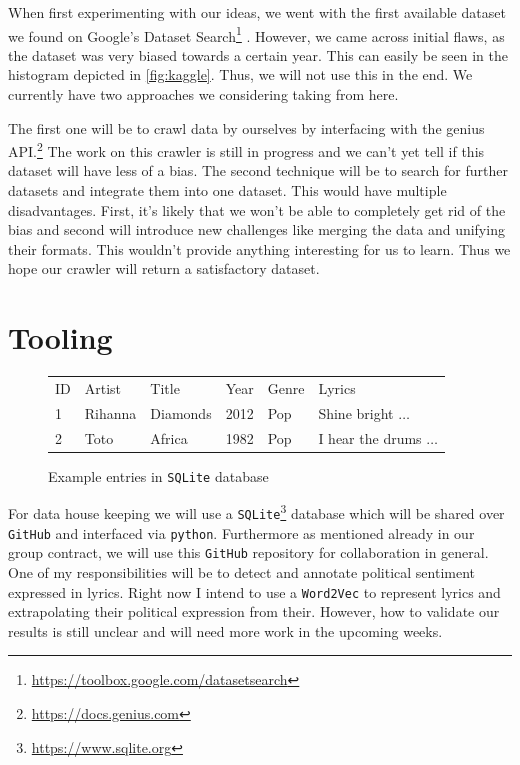 \documentclass[11pt,a4paper]{article}
\begin{document}
When first experimenting with our ideas, we went with the first available dataset we found on Google's Dataset Search\footnote{\url{https://toolbox.google.com/datasetsearch}} \citep{kuznetsov_55000+_2017}. However, we came across initial flaws, as the dataset was very biased towards a certain year. This can easily be seen in the histogram depicted in \cref{fig:kaggle}. Thus, we will not use this in the end. We currently have two approaches we considering taking from here.

The first one will be to crawl data by ourselves by interfacing with the genius API.\footnote{\url{https://docs.genius.com}} The work on this crawler is still in progress and we can't yet tell if this dataset will have less of a bias. The second technique will be to search for further datasets and integrate them into one dataset. This would have multiple disadvantages. First, it's likely that we won't be able to completely get rid of the bias and second will introduce new challenges like merging the data and unifying their formats. This wouldn't provide anything interesting for us to learn. Thus we hope our crawler will return a satisfactory dataset.

\section*{Tooling}
\begin{figure}[h!]
	\centering
	\scriptsize
	\begin{tabular}{llllll}
ID & Artist & Title & Year & Genre & Lyrics \\
1 & Rihanna & Diamonds & 2012 & Pop & Shine bright $\ldots$ \\
2 & Toto & Africa & 1982 & Pop & I hear the drums $\ldots$ \\
	\end{tabular}
	\caption{Example entries in \texttt{SQLite} database}
	\label{fig:table}
\end{figure}
For data house keeping we will use a \texttt{SQLite}\footnote{\url{https://www.sqlite.org}} database which will be shared over \texttt{GitHub} and interfaced via \texttt{python}. Furthermore as mentioned already in our group contract, we will use this \texttt{GitHub} repository for collaboration in general. 
One of my responsibilities will be to detect and annotate political sentiment expressed in lyrics. Right now I intend to use a \texttt{Word2Vec} \citep{mikolov_efficient_2013} to represent lyrics and extrapolating their political expression from their. However, how to validate our results is still unclear and will need more work in the upcoming weeks.
\end{document}
